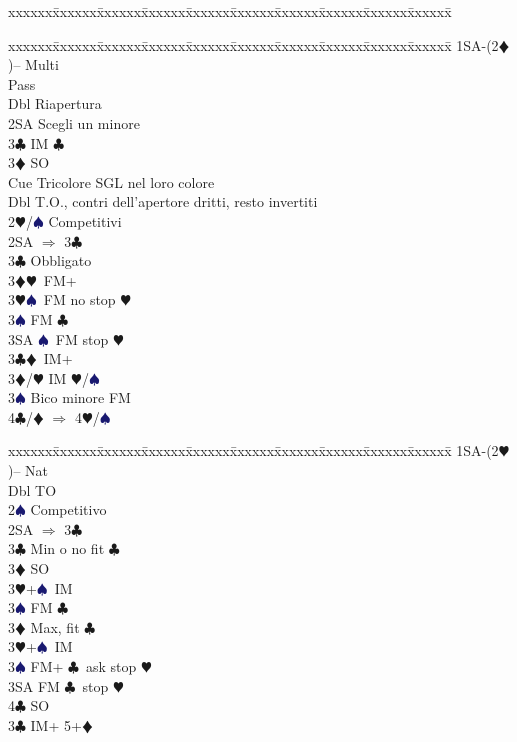 \documentclass[a4paper,italian]{article}
\newcommand{\BC}{\textcolor{OliveGreen}{$\clubsuit$}}
\newcommand{\BD}{\textcolor{RedOrange}{$\vardiamondsuit$}}
\newcommand{\BH}{\textcolor{Red2}{$\varheartsuit${}}}
\newcommand{\BS}{\textcolor{MidnightBlue}{$\spadesuit${}}}
\newenvironment{bidtable}
{\begin{tabbing}

    xxxxxx\=xxxxxx\=xxxxxx\=xxxxxx\=xxxxxx\=xxxxxx\=xxxxxx\=xxxxxx\=xxxxxx\=xxxxxx\=\kill}
{\end{tabbing} }%
\begin{document}
\begin{multicols}{2}
\begin{bidtable}
    \end{bidtable}
    \begin{bidtable}
        1SA-(2\BD)-- \>\> Multi\+\\
        Pass\+\\
        Dbl \> Riapertura\\
        2SA \> Scegli un minore\\
        3\BC \> IM \BC \\
        3\BD \> SO\\
        Cue \> Tricolore SGL nel loro colore\-\\
        Dbl \> T.O., contri dell'apertore dritti, resto invertiti\\
        2\BH/\BS \> Competitivi\\
        2SA \> $\Rightarrow$ 3\BC \+\\
        3\BC \> Obbligato\+\\
        3\BD {}\BH\ FM+\\
        3\BH {}\BS\ FM no stop \BH \\
        3\BS \> FM \BC \\
        3SA \BS\ FM stop \BH \-\-\\
        3\BC {}\BD\ IM+\\
        3\BD/\BH \> IM \BH /\BS \\
        3\BS \> Bico minore FM\\
        4\BC/\BD \> $\Rightarrow$ 4\BH /\BS \-
    \end{bidtable}
    \vfill\null
    \columnbreak
    \begin{bidtable}
        1SA-(2\BH)--\> \> Nat\+\\
        Dbl \> TO\\
        2\BS \> Competitivo\\
        2SA \> $\Rightarrow$ 3\BC \+\\
        3\BC \> Min o no fit \BC\+\\
        3\BD \> SO\\
        3\BH {}+\BS\ IM\\
        3\BS \> FM \BC \-\\
        3\BD \> Max, fit \BC \+\\
        3\BH {}+\BS\ IM\\
        3\BS \> FM+ \BC\ ask stop \BH \\
        3SA \> FM \BC\ stop \BH \\
        4\BC \> SO\-\-\\
        3\BC \> IM+ 5+\BD \\

\end{bidtable}
\end{multicols}
\end{document}
